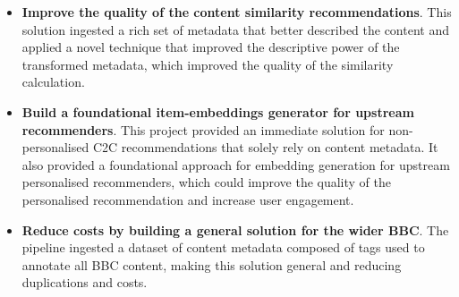 \begin{itemize}
  \item \textbf{Improve the quality of the content similarity recommendations}.
  This solution ingested a rich set of metadata that better described the content
  and applied a novel technique that improved the descriptive power of the transformed metadata,
  which improved the quality of the similarity calculation.
  \item \textbf{Build a foundational item-embeddings generator for upstream recommenders}.
  This project provided an immediate solution for non-personalised C2C recommendations that solely rely on content metadata.
  It also provided a foundational approach for embedding generation for upstream personalised recommenders,
  which could improve the quality of the personalised recommendation and increase user engagement.
  \item \textbf{Reduce costs by building a general solution for the wider BBC}.
  The pipeline ingested a dataset of content metadata composed of tags used to annotate all BBC content,
  making this solution general and reducing duplications and costs.
\end{itemize}
